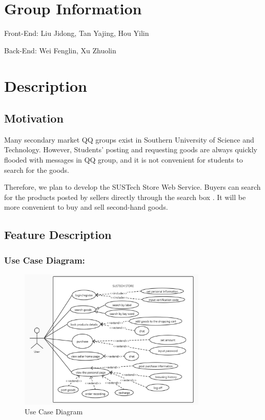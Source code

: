 \documentclass[12pt]{article}  %
\begin{document}
\vspace{30pt}

\tableofcontents

\section{Group Information}

Front-End: Liu Jidong, Tan Yajing, Hou Yilin

Back-End: Wei Fenglin, Xu Zhuolin

\section{Description}

\subsection{Motivation}

Many secondary market QQ groups exist in Southern University 
of Science and Technology. However, Students' posting and 
requesting goods are always quickly flooded with messages in 
QQ group, and it is not convenient for students to search for 
the goods. 

Therefore, we plan to develop the SUSTech Store Web Service. 
Buyers can search for the products posted by sellers directly 
through the search box . It will be more convenient to buy and 
sell second-hand goods.


\subsection{Feature Description}

\subsubsection*{Use Case Diagram:}

\begin{figure}[!htbp]
	\centering
	\includegraphics[width=0.8\textwidth]{images/useCaseDiagram.jpg}
	\caption{Use Case Diagram}
\end{figure}
\end{document}
